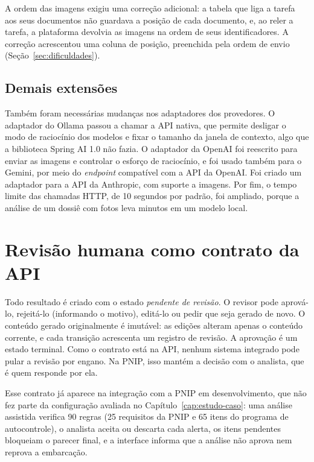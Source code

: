 A ordem das imagens exigiu uma correção adicional: a tabela que liga a tarefa aos seus documentos não guardava a posição de cada documento, e, ao reler a tarefa, a plataforma devolvia as imagens na ordem de seus identificadores. A correção acrescentou uma coluna de posição, preenchida pela ordem de envio (Seção~\ref{sec:dificuldades}).

\subsection{Demais extensões}

Também foram necessárias mudanças nos adaptadores dos provedores. O adaptador do Ollama passou a chamar a API nativa, que permite desligar o modo de raciocínio dos modelos e fixar o tamanho da janela de contexto, algo que a biblioteca Spring AI 1.0 não fazia. O adaptador da OpenAI foi reescrito para enviar as imagens e controlar o esforço de raciocínio, e foi usado também para o Gemini, por meio do \textit{endpoint} compatível com a API da OpenAI. Foi criado um adaptador para a API da Anthropic, com suporte a imagens. Por fim, o tempo limite das chamadas HTTP, de 10 segundos por padrão, foi ampliado, porque a análise de um dossiê com fotos leva minutos em um modelo local.

\section{Revisão humana como contrato da API}
\label{sec:revisao-humana}

Todo resultado é criado com o estado \textit{pendente de revisão}. O revisor pode aprová-lo, rejeitá-lo (informando o motivo), editá-lo ou pedir que seja gerado de novo. O conteúdo gerado originalmente é imutável: as edições alteram apenas o conteúdo corrente, e cada transição acrescenta um registro de revisão. A aprovação é um estado terminal. Como o contrato está na API, nenhum sistema integrado pode pular a revisão por engano. Na PNIP, isso mantém a decisão com o analista, que é quem responde por ela.

Esse contrato já aparece na integração com a PNIP em desenvolvimento, que não fez parte da configuração avaliada no Capítulo~\ref{cap:estudo-caso}: uma análise assistida verifica 90 regras (25 requisitos da PNIP e 65 itens do programa de autocontrole), o analista aceita ou descarta cada alerta, os itens pendentes bloqueiam o parecer final, e a interface informa que a análise não aprova nem reprova a embarcação.
